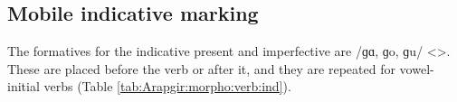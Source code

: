 \begin{table}[H] \centering
	\caption{Instrumental marking in the Arapgir dialect}
	\label{tab:Arapgir:morpho:noun:inst}
\end{table}

\subsection{Mobile indicative marking}


The formatives for the indicative present and   imperfective are /ɡɑ, ɡo, ɡu/ <>. These are placed before the verb or after it, and they are repeated for vowel-initial verbs (Table \ref{tab:Arapgir:morpho:verb:ind}).


